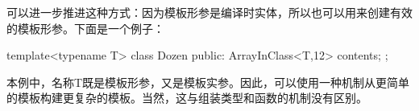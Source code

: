 可以进一步推进这种方式：因为模板形参是编译时实体，所以也可以用来创建有效的模板形参。下面是一个例子：

\begin{cpp}
template<typename T>
class Dozen {
	public:
	ArrayInClass<T,12> contents;
};
\end{cpp}

本例中，名称T既是模板形参，又是模板实参。因此，可以使用一种机制从更简单的模板构建更复杂的模板。当然，这与组装类型和函数的机制没有区别。


























